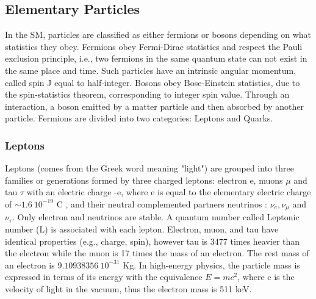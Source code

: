 \subsection{Elementary Particles}
\label{chap1:SM:EP}
In the SM, particles are classified as either fermions or bosons depending on what statistics they obey. Fermions obey Fermi-Dirac statistics and respect the Pauli exclusion principle, i.e., two fermions in the same quantum state can not exist in the same place and time. Such particles have an intrinsic angular momentum, called spin J equal to half-integer. Bosons obey Bose-Einstein statistics, due to the spin-statistics theorem, corresponding to integer spin value. Through an interaction, a boson emitted by a matter particle and then absorbed by another particle. Fermions are divided into two categories: Leptons and Quarks.

\subsubsection{Leptons}
Leptons (comes from the Greek word meaning "light") are grouped into three families or generations formed by three charged leptons: electron e, muons $\mu$ and tau $\tau$ with an electric charge -e, where e is equal to the elementary electric charge of $\sim 1.6 \ 10^{-19} $ C \cite{PDG}, and their neutral complemented partners neutrinos : $\nu_{e}, \nu_{\mu}$ and $\nu_{\tau}$. Only electron and neutrinos are stable. A quantum number called Leptonic number (L) is associated with each lepton. Electron, muon, and tau have identical properties (e.g., charge, spin), however tau is 3477 times heavier than the electron while the muon is 17 times the mass of an electron. The rest mass of an electron is $9.10938356 \ 10^{-31} $ Kg. In high-energy physics, the particle mass is expressed in terms of its energy with the equivalence $E=mc^2$, where c is the velocity of light in the vacuum, thus the electron mass is 511 keV.

